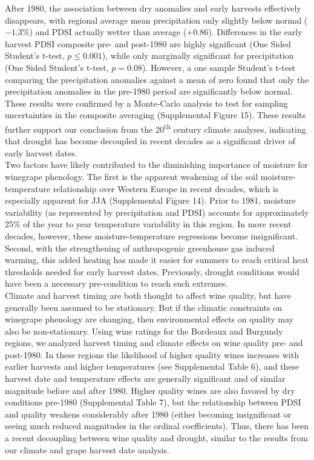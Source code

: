 \documentclass[final]{nature}
\begin{document}
\indent After 1980, the association between dry anomalies and early harvests effectively disappears, with regional average mean precipitation only slightly below normal ($-1.3\%$) and PDSI actually wetter than average ($+0.86$). Differences in the early harvest PDSI composite pre- and post-1980 are highly significant (One Sided Student's t-test, $p\le0.001$), while only marginally significant for precipitation (One Sided Student's t-test, $p=0.08$). However, a one sample Student's t-test comparing the precipitation anomalies against a mean of zero found that only the precipitation anomalies in the pre-1980 period are significantly below normal. These results were confirmed by a Monte-Carlo analysis to test for sampling uncertainties in the composite averaging (Supplemental Figure 15). These results further support our conclusion from the 20\textsuperscript{th} century climate analyses, indicating that drought has become decoupled in recent decades as a significant driver of early harvest dates.\\
\indent Two factors have likely contributed to the diminishing importance of moisture for winegrape phenology. The first is the apparent weakening of the soil moisture-temperature relationship over Western Europe in recent decades, which is especially apparent for JJA (Supplemental Figure 14). Prior to 1981, moisture variability (as represented by precipitation and PDSI) accounts for approximately 25\% of the year to year temperature variability in this region. In more recent decades, however, these moisture-temperature regressions become insignificant. Second, with the strengthening of anthropogenic greenhouse gas induced warming, this added heating has made it easier for summers to reach critical heat thresholds needed for early harvest dates. Previously, drought conditions would have been a necessary pre-condition to reach such extremes.\\
\indent Climate and harvest timing are both thought to affect wine quality, but have generally been assumed to be stationary. But if the climatic constraints on winegrape phenology are changing, then environmental effects on quality may also be non-stationary. Using wine ratings for the Bordeaux and Burgundy regions\cite{Broadbent2002}, we analyzed harvest timing and climate effects on wine quality pre- and post-1980. In these regions the likelihood of higher quality wines increases with earlier harvests and higher temperatures (see Supplemental Table 6), and these harvest date and temperature effects are generally significant and of similar magnitude before and after 1980. Higher quality wines are also favored by dry conditions pre-1980 (Supplemental Table 7), but the relationship between PDSI and quality weakens considerably after 1980 (either becoming insignificant or seeing much reduced magnitudes in the ordinal coefficients). Thus, there has been a recent decoupling between wine quality and drought, similar to the results from our climate and grape harvest date analysis.\\
\end{document}
